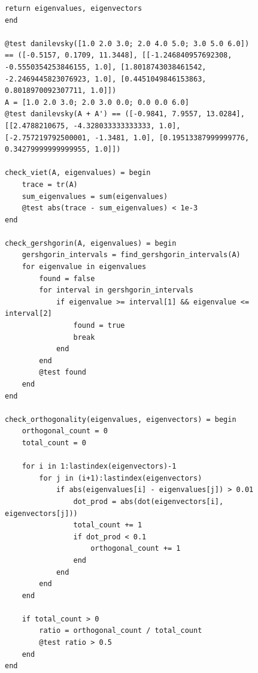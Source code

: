 \documentclass[a4paper, 14pt]{extarticle}
\begin{document}
\begin{figure}[!htb]
\begin{lstlisting}[language={},caption={Метод Данилевского (продолжение)},label={lst:code4}]
    return eigenvalues, eigenvectors
end

@test danilevsky([1.0 2.0 3.0; 2.0 4.0 5.0; 3.0 5.0 6.0]) == ([-0.5157, 0.1709, 11.3448], [[-1.246840957692308, -0.5550354253846155, 1.0], [1.8018743038461542, -2.2469445823076923, 1.0], [0.4451049846153863, 0.8018970092307711, 1.0]])
A = [1.0 2.0 3.0; 2.0 3.0 0.0; 0.0 0.0 6.0]
@test danilevsky(A + A') == ([-0.9841, 7.9557, 13.0284], [[2.4788210675, -4.328033333333333, 1.0], [-2.757219792500001, -1.3481, 1.0], [0.19513387999999776, 0.34279999999999955, 1.0]])

check_viet(A, eigenvalues) = begin
    trace = tr(A)
    sum_eigenvalues = sum(eigenvalues)
    @test abs(trace - sum_eigenvalues) < 1e-3
end

check_gershgorin(A, eigenvalues) = begin
    gershgorin_intervals = find_gershgorin_intervals(A)
    for eigenvalue in eigenvalues
        found = false
        for interval in gershgorin_intervals
            if eigenvalue >= interval[1] && eigenvalue <= interval[2]
                found = true
                break
            end
        end
        @test found
    end
end

check_orthogonality(eigenvalues, eigenvectors) = begin
    orthogonal_count = 0
    total_count = 0

    for i in 1:lastindex(eigenvectors)-1
        for j in (i+1):lastindex(eigenvectors)
            if abs(eigenvalues[i] - eigenvalues[j]) > 0.01
                dot_prod = abs(dot(eigenvectors[i], eigenvectors[j]))
                total_count += 1
                if dot_prod < 0.1
                    orthogonal_count += 1
                end
            end
        end
    end

    if total_count > 0
        ratio = orthogonal_count / total_count
        @test ratio > 0.5
    end
end

\end{lstlisting}
\end{figure}
\end{document}
